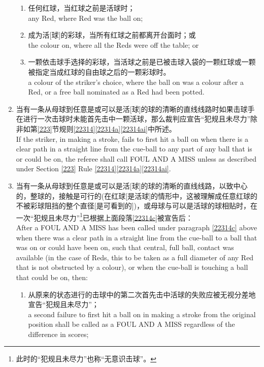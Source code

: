 \begin{enumerate}[label=(\alph*)]
    \begin{enumerate}[label=(\roman*)]
        \item 任何红球，当红球之前是活球时；\\
        any Red, where Red was the ball on;
        \item 成为活[球]的彩球，当所有红球之前都离开台面时；或\\
        the colour on, where all the Reds were off the table; or
        \item 一颗依击球手选择的彩球，当活球之前是已被击球入袋的一颗红球或一颗被指定当成红球的自由球之后的一颗彩球时。\\
        a colour of the striker's choice, where the ball on was a colour after a Red, or a free ball nominated as a Red had been potted.
    \end{enumerate}
    \item \label{22314c}当有一条从母球到任意是或可以是活[球]的球的清晰的直线线路时如果击球手在进行一次击球时未能首先击中一颗活球，那么裁判应宣告``犯规且未尽力''除非如第\ref{223}节规则\ref{22314}\ref{22314a}\ref{22314ai}中所述。\\
    If the striker, in making a stroke, fails to first hit a ball on when there is a clear path in a straight line from the cue-ball to any part of any ball that is or could be on, the referee shall call FOUL AND A MISS unless as described under Section \ref{223} Rule \ref{22314}\ref{22314a}\ref{22314ai}.
    \item \label{22314d}当有一条从母球到任意是或可以是活[球]的球的清晰的直线线路，以致中心的，整球的，接触是可行的(在红球[是活球]的情形中，这被理解成任意红球的不被彩球阻挡的整个直径[是可看到的])，或母球与可以是活球的球相贴时，在一次``犯规且未尽力''\footnote{此时的``犯规且未尽力''也称``无意识击球''。}已根据上面段落\ref{22314c}被宣告后：\\
    After a FOUL AND A MISS has been called under paragraph \ref{22314c} above when there was a clear path in a straight line from the cue-ball to a ball that was on or could have been on, such that central, full ball, contact was available (in the case of Reds, this to be taken as a full diameter of any Red that is not obstructed by a colour), or when the cue-ball is touching a ball that could be on, then:
    \begin{enumerate}[label=(\roman*)]
        \item \label{22314di}从原来的状态进行的击球中的第二次首先击中活球的失败应被无视分差地宣告``犯规且未尽力''；\\
        a second failure to first hit a ball on in making a stroke from the original position shall be called as a FOUL AND A MISS regardless of the difference in scores;

\end{enumerate}
\end{enumerate}
